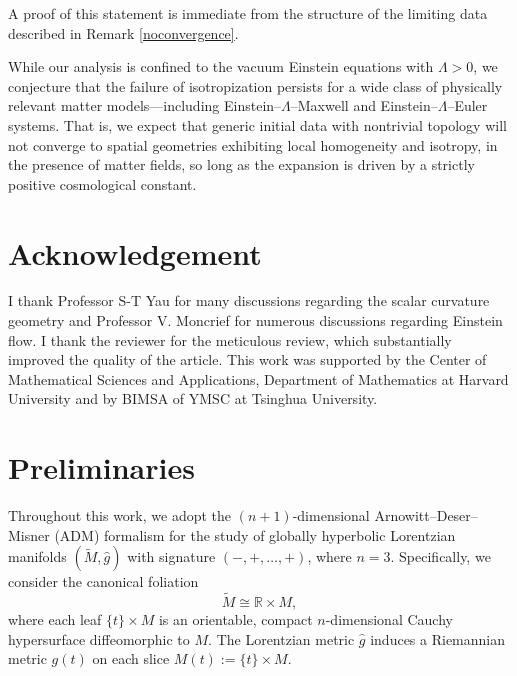 \documentclass{amsart}
\newtheorem{corollary}{Corollary}[section]
\begin{document}

\noindent A proof of this statement is immediate from the structure of the limiting data described in Remark \ref{noconvergence}.
\medskip

\noindent While our analysis is confined to the vacuum Einstein equations with $\Lambda>0$, we conjecture that the failure of isotropization persists for a wide class of physically relevant matter models—including Einstein–$\Lambda$–Maxwell and Einstein–$\Lambda$–Euler systems. That is, we expect that generic initial data with nontrivial topology will not converge to spatial geometries exhibiting local homogeneity and isotropy, in the presence of matter fields, so long as the expansion is driven by a strictly positive cosmological constant.

 

\section*{Acknowledgement}
\noindent I thank Professor S-T Yau for many discussions regarding the scalar curvature geometry and Professor V. Moncrief for numerous discussions regarding Einstein flow. I thank the reviewer for the meticulous review, which substantially improved the quality of the article. This work was supported by the Center of Mathematical Sciences and Applications, Department of Mathematics at Harvard University and by BIMSA of YMSC at Tsinghua University.


\section{Preliminaries}

\noindent Throughout this work, we adopt the $(n+1)$-dimensional Arnowitt--Deser--Misner (ADM) formalism for the study of globally hyperbolic Lorentzian manifolds $(\widetilde{M},\widehat{g})$ with signature $(-,+,\ldots,+)$, where $n=3$. Specifically, we consider the canonical foliation 
\[
\widetilde{M} \cong \mathbb{R} \times M,
\]
where each leaf $\{t\} \times M$ is an orientable, compact $n$-dimensional Cauchy hypersurface diffeomorphic to $M$. The Lorentzian metric $\widehat{g}$ induces a Riemannian metric $g(t)$ on each slice $M(t) := \{t\}\times M$.
\end{document}

